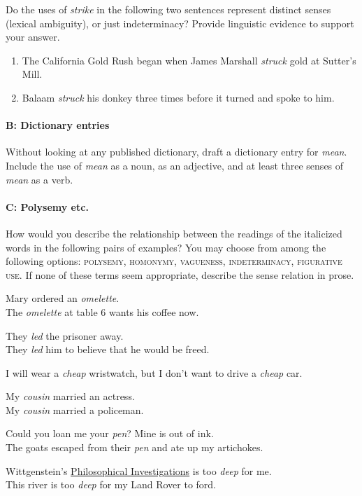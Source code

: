Do the uses of \textit{strike} in the following two sentences represent distinct senses (lexical ambiguity), or just indeterminacy? Provide linguistic evidence to support your answer.

\begin{enumerate}
 \item The California Gold Rush began when James Marshall \textit{struck} gold at Sutter’s Mill.
 \item  Balaam \textit{struck} his donkey three times before it turned and spoke to him.
\end{enumerate}
 
\paragraph*{B: Dictionary entries}

Without looking at any published dictionary, draft a dictionary entry for \textit{mean}. Include the use of \textit{mean} as a noun, as an adjective, and at least three senses of \textit{mean} as a verb.

\paragraph*{C: Polysemy etc.\footnotemark{}}

How would you describe the relationship between the readings of the italicized words in the following pairs of examples? You may choose from among the following options: \textsc{polysemy, homonymy, vagueness, indeterminacy, figurative use.} If none of these terms seem appropriate, describe the sense relation in prose.
 
\ea\ea Mary ordered an \textit{omelette}.\\
\ex The \textit{omelette} at table 6 wants his coffee now.
\z\z

\ea\ea They \textit{led} the prisoner away.\\
\ex They \textit{led} him to believe that he would be freed.
\z\z

\ea I will wear a \textit{cheap} wristwatch, but I don’t want to drive a \textit{cheap} car.
\z

\ea\ea My \textit{cousin} married an actress.\\
\ex My \textit{cousin} married a policeman.
\z\z

\ea\ea Could you loan me your \textit{pen}? Mine is out of ink.\\
\ex The goats escaped from their \textit{pen} and ate up my artichokes.
\z\z


\ea\ea Wittgenstein’s \href{http://en.wikipedia.org/wiki/Philosophical_Investigations}{Philosophical Investigations} is too \textit{deep} for me.\\
\ex This river is too \textit{deep} for my Land Rover to ford.
\z\z

